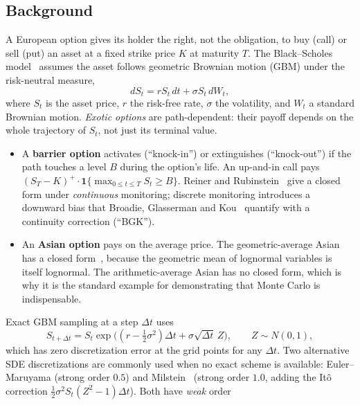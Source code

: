 \documentclass[sigconf]{acmart}
\begin{document}
\subsection{Background}
A European option gives its holder the right, not the obligation, to buy
(call) or sell (put) an asset at a fixed strike price $K$ at maturity $T$. The
Black--Scholes model~\cite{BlackScholes1973} assumes the asset follows
geometric Brownian motion (GBM) under the risk-neutral measure,
\begin{equation}
  dS_t = r S_t\,dt + \sigma S_t\,dW_t,
  \label{eq:gbm}
\end{equation}
where $S_t$ is the asset price, $r$ the risk-free rate, $\sigma$ the
volatility, and $W_t$ a standard Brownian motion. \emph{Exotic options} are
path-dependent: their payoff depends on the whole trajectory of $S_t$, not
just its terminal value.
\begin{itemize}
  \item A \textbf{barrier option} activates (``knock-in'') or extinguishes
    (``knock-out'') if the path touches a level $B$ during the option's life.
    An up-and-in call pays $(S_T-K)^+ \cdot \mathbf{1}\{\max_{0\le t\le T}
    S_t \ge B\}$. Reiner and Rubinstein~\cite{ReinerRubinstein1991} give a
    closed form under \emph{continuous} monitoring; discrete monitoring
    introduces a downward bias that Broadie, Glasserman and
    Kou~\cite{BroadieGlassermanKou1997} quantify with a continuity
    correction (``BGK'').
  \item An \textbf{Asian option} pays on the average price. The
    geometric-average Asian has a closed form~\cite{KemnaVorst1990}, because
    the geometric mean of lognormal variables is itself lognormal. The
    arithmetic-average Asian has no closed form, which is why it is the
    standard example for demonstrating that Monte Carlo is indispensable.
\end{itemize}
Exact GBM sampling at a step $\Delta t$ uses
\begin{equation}
  S_{t+\Delta t} = S_t \exp\!\big((r-\tfrac12\sigma^2)\Delta t + \sigma\sqrt{\Delta t}\,Z\big),
  \qquad Z\sim N(0,1),
  \label{eq:exact-scheme}
\end{equation}
which has zero discretization error at the grid points for any $\Delta t$.
Two alternative SDE discretizations are commonly used when no exact scheme is
available: Euler--Maruyama (strong order $0.5$) and
Milstein~\cite{KloedenPlaten1992} (strong order $1.0$, adding the It\^{o}
correction $\tfrac12\sigma^2 S_t(Z^2-1)\Delta t$). Both have \emph{weak} order
\end{document}

